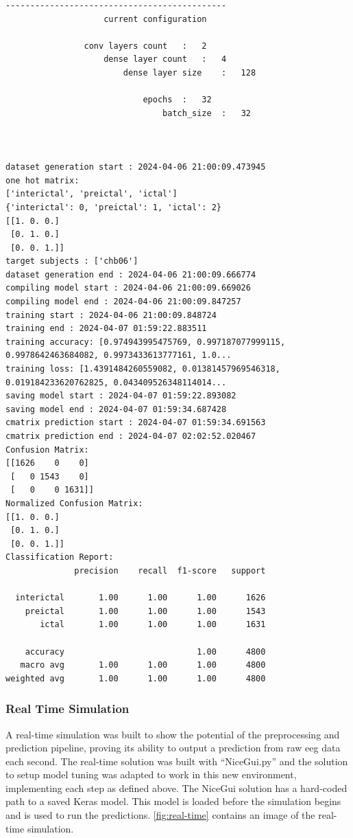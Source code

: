 \documentclass[12pt]{article}
\begin{document}
\begin{lstlisting}[style=logstyle, caption={Logging file programmatically generated during the tuning process. Training accuracy and loss lines have been trimmed for readability.}, label={lst:tuning-metrics}]
       ---------------------------------------------
                    current configuration

                conv layers count   :   2
                    dense layer count   :   4
                        dense layer size    :   128

                            epochs  :   32
                                batch_size  :   32

            
                
dataset generation start : 2024-04-06 21:00:09.473945
one hot matrix:
['interictal', 'preictal', 'ictal']
{'interictal': 0, 'preictal': 1, 'ictal': 2}
[[1. 0. 0.]
 [0. 1. 0.]
 [0. 0. 1.]]
target subjects : ['chb06']
dataset generation end : 2024-04-06 21:00:09.666774
compiling model start : 2024-04-06 21:00:09.669026
compiling model end : 2024-04-06 21:00:09.847257
training start : 2024-04-06 21:00:09.848724
training end : 2024-04-07 01:59:22.883511
training accuracy: [0.974943995475769, 0.997187077999115, 0.9978642463684082, 0.9973433613777161, 1.0...
training loss: [1.4391484260559082, 0.01381457969546318, 0.019184233620762825, 0.043409526348114014...
saving model start : 2024-04-07 01:59:22.893082
saving model end : 2024-04-07 01:59:34.687428
cmatrix prediction start : 2024-04-07 01:59:34.691563
cmatrix prediction end : 2024-04-07 02:02:52.020467
Confusion Matrix:
[[1626    0    0]
 [   0 1543    0]
 [   0    0 1631]]
Normalized Confusion Matrix:
[[1. 0. 0.]
 [0. 1. 0.]
 [0. 0. 1.]]
Classification Report:
              precision    recall  f1-score   support

  interictal       1.00      1.00      1.00      1626
    preictal       1.00      1.00      1.00      1543
       ictal       1.00      1.00      1.00      1631

    accuracy                           1.00      4800
   macro avg       1.00      1.00      1.00      4800
weighted avg       1.00      1.00      1.00      4800
\end{lstlisting}


\subsubsection{Real Time Simulation}

A real-time simulation was built to show the potential of the preprocessing and prediction pipeline, proving its ability to output a prediction from raw \acrshort{eeg} data each second. The real-time solution was built with ``NiceGui.py'' and the solution to setup model tuning was adapted to work in this new environment, implementing each step as defined above. The NiceGui solution has a hard-coded path to a saved Keras model. This model is loaded before the simulation begins and is used to run the predictions. \ref{fig:real-time} contains an image of the real-time simulation.
\end{document}
